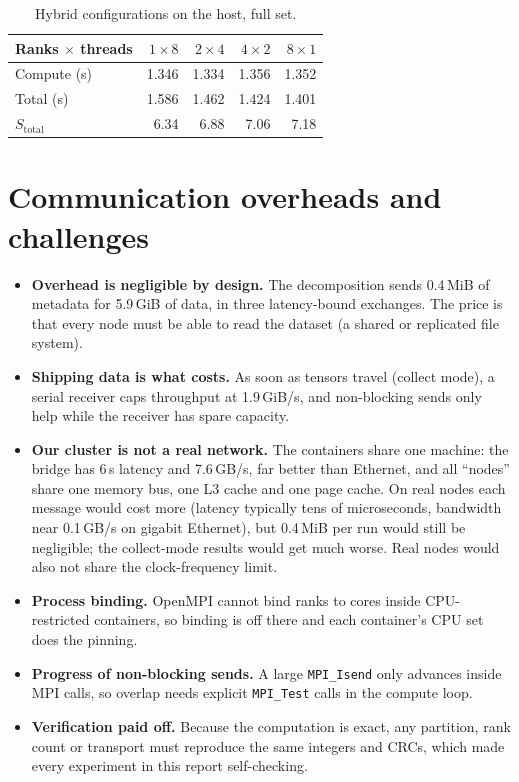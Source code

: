 \documentclass{zc-ust-hw}
\begin{document}
\begin{table}[H]
\centering\small
\begin{tabular}{lrrrr}
\toprule
Ranks $\times$ threads & $1\times8$ & $2\times4$ & $4\times2$ & $8\times1$ \\
\midrule
Compute (s) & 1.346 & 1.334 & 1.356 & 1.352 \\
Total (s) & 1.586 & 1.462 & 1.424 & 1.401 \\
$S_\text{total}$ & 6.34 & 6.88 & 7.06 & 7.18 \\
\bottomrule
\end{tabular}
\caption{Hybrid configurations on the host, full set.}
\label{tab:hybrid}
\end{table}

\section{Communication overheads and challenges}

\begin{itemize}
  \item \textbf{Overhead is negligible by design.} The decomposition sends 0.4\,MiB of metadata
    for 5.9\,GiB of data, in three latency-bound exchanges. The price is that every node must
    be able to read the dataset (a shared or replicated file system).
  \item \textbf{Shipping data is what costs.} As soon as tensors travel (collect mode), a
    serial receiver caps throughput at 1.9\,GiB/s, and non-blocking sends only help while the
    receiver has spare capacity.
  \item \textbf{Our cluster is not a real network.} The containers share one machine: the
    bridge has 6\,\textmu s latency and 7.6\,GB/s, far better than Ethernet, and all ``nodes''
    share one memory bus, one L3 cache and one page cache. On real nodes each message would
    cost more (latency typically tens of microseconds, bandwidth near 0.1\,GB/s on gigabit
    Ethernet), but 0.4\,MiB per run would still be negligible; the collect-mode results would
    get much worse. Real nodes would also not share the clock-frequency limit.
  \item \textbf{Process binding.} OpenMPI cannot bind ranks to cores inside CPU-restricted
    containers, so binding is off there and each container's CPU set does the pinning.
  \item \textbf{Progress of non-blocking sends.} A large \texttt{MPI\_Isend} only advances
    inside MPI calls, so overlap needs explicit \texttt{MPI\_Test} calls in the compute loop.
  \item \textbf{Verification paid off.} Because the computation is exact, any partition, rank
    count or transport must reproduce the same integers and CRCs, which made every experiment
    in this report self-checking.
\end{itemize}
\end{document}
